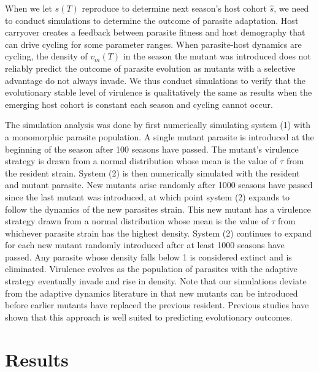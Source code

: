 \documentclass{article}
\begin{document}
When we let $s(T)$ reproduce to determine next season's host cohort $\hat{s}$, we need to conduct simulations to determine the outcome of parasite adaptation. Host carryover creates a feedback between parasite fitness and host demography that can drive cycling for some parameter ranges. When parasite-host dynamics are cycling, the density of $v_{m}(T)$ in the season the mutant was introduced does not reliably predict the outcome of parasite evolution as mutants with a selective advantage do not always invade\cite{}. We thus conduct simulations to verify that the evolutionary stable level of virulence is qualitatively the same as results when the emerging host cohort is constant each season and cycling cannot occur.

The simulation analysis was done by first numerically simulating system (1) with a monomorphic parasite population. A single mutant parasite is introduced at the beginning of the season after 100 seasons have passed. The mutant's virulence strategy is drawn from a normal distribution whose mean is the value of $\tau$ from the resident strain. System (2) is then numerically simulated with the resident and mutant parasite. New mutants arise randomly after 1000 seasons have passed since the last mutant was introduced, at which point system (2) expands to follow the dynamics of the new parasites strain. This new mutant has a virulence strategy drawn from a normal distribution whose mean is the value of $\tau$ from whichever parasite strain has the highest density. System (2) continues to expand for each new mutant randomly introduced after at least 1000 seasons have passed. Any parasite whose density falls below 1 is considered extinct and is eliminated. Virulence evolves as the population of parasites with the adaptive strategy eventually invade and rise in density. Note that our simulations deviate from the adaptive dynamics literature in that new mutants can be introduced before earlier mutants have replaced the previous resident. Previous studies have shown that this approach is well suited to predicting evolutionary outcomes\cite{kisdi1999evolutionary,white2005adaptive,white2006evolutionary}.

\section*{Results}
\end{document}

